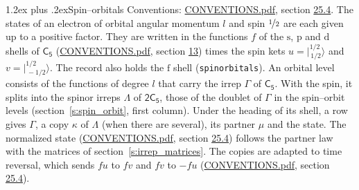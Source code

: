 \documentclass[10pt,a4paper]{article}
\makeatletter
\renewcommand\section{\@startsection{section}{1}{\z@}{-3ex plus -1ex minus -.2ex}%
  {1.2ex plus .2ex}{\normalfont\large\sffamily\bfseries\color{parttitle}}}
\numberwithin{equation}{section}
\newcommand{\grp}[1]{\mathsf{#1}}
\newcommand{\orbital}[1]{\mathrm{#1}}
\newcommand{\mult}{\kappa}
\newcommand{\intx}{\mu}
\newcommand{\jm}[2]{\bigl\lvert{}^{#1}_{\,#2}\bigr\rangle}
\makeatother
\begin{document}
\section{Spin--orbitals}\label{s:spin_orbitals}
Conventions: \href{../../CONVENTIONS.pdf}{CONVENTIONS.pdf}, section \href{../../CONVENTIONS.pdf\#conv.25.4}{25.4}.
\leavevmode\label{n:index.orbital.l}The states of an electron of orbital angular momentum $l$ and spin $\nicefrac{1}{2}$ are each given up to a positive factor. \label{n:local.spinor.uv}\label{n:local.function.f}They are written in the functions $f$ of the $\orbital{s}$, $\orbital{p}$ and $\orbital{d}$ shells of \href{../../../rotation/data/pdf/C5.pdf}{$\grp{C_{5}}$} (\href{../../CONVENTIONS.pdf}{CONVENTIONS.pdf}, section \href{../../../rotation/CONVENTIONS.pdf\#conv.13}{13}) times the spin kets $u = \jm{1/2}{1/2}$ and $v = \jm{1/2}{-1/2}$. The record also holds the $\orbital{f}$ shell (\texttt{spinorbitals}). An orbital level consists of the functions of degree $l$ that carry the irrep $\Gamma$ of \href{../../../rotation/data/pdf/C5.pdf}{$\grp{C_{5}}$}. With the spin, it splits into the spinor irreps $\Lambda$ of $\grp{2C_{5}}$, those of the doublet of $\Gamma$ in the spin--orbit levels (section~\ref{s:spin_orbit}, first column). \label{n:head.state}Under the heading of its shell, a row gives $\Gamma$, a copy $\mult$ of $\Lambda$ (when there are several), its partner $\intx$ and the state. The normalized state (\href{../../CONVENTIONS.pdf}{CONVENTIONS.pdf}, section \href{../../CONVENTIONS.pdf\#conv.25.4}{25.4}) follows the partner law with the matrices of section~\ref{s:irrep_matrices}. The copies are adapted to time reversal, which sends $f u$ to $f v$ and $f v$ to $-f u$ (\href{../../CONVENTIONS.pdf}{CONVENTIONS.pdf}, section \href{../../CONVENTIONS.pdf\#conv.25.4}{25.4}).
\end{document}
